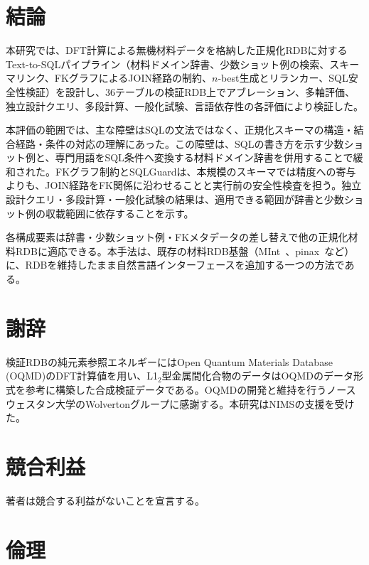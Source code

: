 \documentclass[twocolumn]{interact}
\begin{document}
\section{結論}\label{sec:conclusion}

本研究では、DFT計算による無機材料データを格納した正規化RDBに対するText-to-SQLパイプライン（材料ドメイン辞書、少数ショット例の検索、スキーマリンク、FKグラフによるJOIN経路の制約、$n$-best生成とリランカー、SQL安全性検証）を設計し、36テーブルの検証RDB上でアブレーション、多軸評価、独立設計クエリ、多段計算、一般化試験、言語依存性の各評価により検証した。

本評価の範囲では、主な障壁はSQLの文法ではなく、正規化スキーマの構造・結合経路・条件の対応の理解にあった。この障壁は、SQLの書き方を示す少数ショット例と、専門用語をSQL条件へ変換する材料ドメイン辞書を併用することで緩和された。FKグラフ制約とSQLGuardは、本規模のスキーマでは精度への寄与よりも、JOIN経路をFK関係に沿わせることと実行前の安全性検査を担う。独立設計クエリ・多段計算・一般化試験の結果は、適用できる範囲が辞書と少数ショット例の収載範囲に依存することを示す。

各構成要素は辞書・少数ショット例・FKメタデータの差し替えで他の正規化材料RDBに適応できる。本手法は、既存の材料RDB基盤（MInt~\cite{minamoto2020mint}、pinax~\cite{minamoto2026pinax}など）に、RDBを維持したまま自然言語インターフェースを追加する一つの方法である。

\section*{謝辞}

検証RDBの純元素参照エネルギーにはOpen Quantum Materials Database (OQMD)のDFT計算値を用い、L1$_2$型金属間化合物のデータはOQMDのデータ形式を参考に構築した合成検証データである。OQMDの開発と維持を行うノースウェスタン大学のWolvertonグループに感謝する。本研究はNIMSの支援を受けた。

\section*{競合利益}

著者は競合する利益がないことを宣言する。

\section*{倫理}
\end{document}
